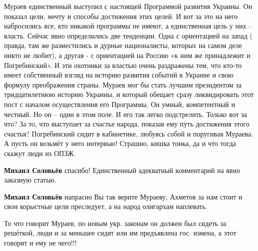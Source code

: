 \begin{itemize}

Мураев единственный выступил с настоящей Программой развития Украины. Он
показал цели, мечту и способы достижения этих целей. И вот за это на него
набросились все, кто никакой программы не имеют, а единственная цель у них –
власть. Сейчас явно определились две тенденции. Одна с ориентацией на запад (
правда, там же разместились и дурные националисты, которых на самом деле никто
не любит), а другая - с ориентацией на Россию «к ним же принадлежит и
Погребинский». И эти охотники за властью очень раздражены тем, что кто-то имеет
собственный взгляд на историю развития событий в Украине и свою формулу
преображения страны. Мураев мог бы стать лучшим президентом за тридцатилетнюю
историю Украины, и который обещает сразу ликвидировать этот пост с началом
осуществления его Программы. Он умный, компетентный и честный. Но он – один в
этом поле. И его так легко подстрелить. Только вот за что? За то, что выступает
за счастье народа, показав ему путь достижения этого счастья? Погребинский
сидит в кабинетике, любуясь собой и поругивая Мураева. А пусть он возьмёт у
него интервью! Страшно, кишка тонка, да и что тогда скажут люди из ОПЗЖ.

\begin{itemize} %
\textbf{Михаил Соловьёв} спасибо! Единственный адекватный комментарий на явно заказную статью.

\textbf{Михаил Соловьёв} напрасно Вы так верите Мураеву, Ахметов за нам стоит и свои корыстные цели преследует, а на народ олигархам наплевать.
\end{itemize} %


То что говорит Мураев, по новым укр. законам он должен был сидеть за
решёткой, люди и за меньшее сидят или им предъявлена гос. измена, а этот говорит и
ему не чего!!!


\end{itemize} %
